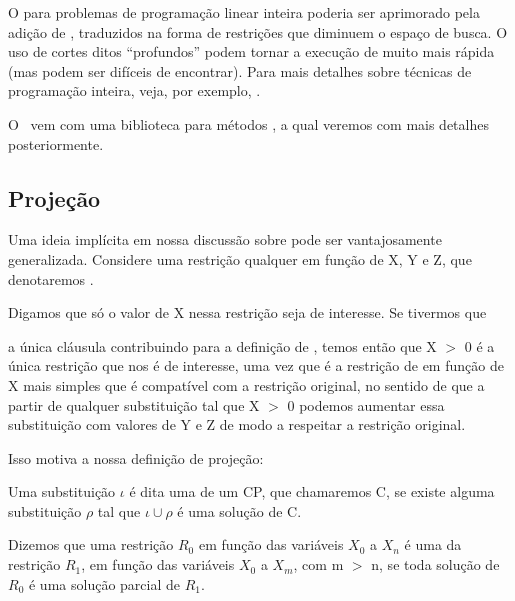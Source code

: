 O  para problemas de programação linear
inteira poderia ser aprimorado pela adição de , traduzidos na forma de restrições que diminuem o espaço de
busca. O uso de cortes ditos ``profundos'' podem tornar a execução de
 muito mais rápida (mas podem ser difíceis
de encontrar). Para mais detalhes sobre técnicas de programação
inteira, veja, por exemplo, \cite{tsitsiklis}.

O \eclipse\ vem com uma biblioteca para métodos , a qual veremos com mais detalhes posteriormente.

\subsection{Projeção}

Uma ideia implícita em nossa discussão sobre  pode ser vantajosamente generalizada. Considere uma restrição
qualquer em função de X, Y e Z, que denotaremos
.

Digamos que só o valor de X nessa restrição seja de interesse. Se
tivermos que


 a única cláusula contribuindo para a definição de
, temos então que X $>$
0 é a única restrição que nos é de interesse, uma vez que é a
restrição de em função de X mais simples que é compatível com a
restrição original, no sentido de que a partir de qualquer
substituição tal que X $>$ 0 podemos aumentar essa substituição com
valores de Y e Z de modo a respeitar a restrição original.

Isso motiva a nossa definição de projeção:

\begin{definition}
  Uma substituição $\iota$ é dita uma  de
  um CP, que chamaremos C, se existe alguma substituição $\rho$ tal
  que $\iota \cup \rho$ é uma solução de C.
\end{definition}

\begin{definition}
  Dizemos que uma restrição $R_0$ em função das variáveis $X_0$ a
  $X_n$ é uma  da restrição $R_1$, em função das
  variáveis $X_0$ a $X_m$, com m $>$ n, se toda solução de $R_0$ é uma
  solução parcial de $R_1$.
\end{definition}

